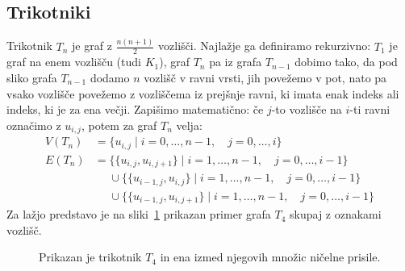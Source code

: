 \documentclass[12pt,a4paper,twoside]{article}
\theoremstyle{definition} %
\theoremstyle{plain} %
\numberwithin{equation}{section}  %
\begin{document}
\subsection{Trikotniki}
Trikotnik $T_n$ je graf z $\frac{n (n+1)}{2}$ vozlišči. Najlažje ga definiramo rekurzivno:
$T_1$ je graf na enem vozlišču (tudi $K_1$), graf $T_n$ pa iz grafa $T_{n-1}$ dobimo tako, da pod sliko grafa $T_{n-1}$ dodamo $n$ vozlišč v ravni vrsti, jih povežemo v pot, nato pa vsako vozlišče povežemo z vozliščema iz prejšnje ravni, ki imata enak indeks ali indeks, ki je za ena večji. Zapišimo matematično: če $j$-to vozlišče na $i$-ti ravni označimo z $u_{i,j}$, potem za graf $T_n$ velja:
\begin{align*}
    V(T_n) &= \{u_{i,j} \mid i=0,\ldots,n-1, \quad j=0,\ldots,i \} \\
    E(T_n) &= \{ \{u_{i,j}, u_{i, j+1} \} \mid i=1,\ldots,n-1, \quad j=0,\ldots,i-1  \} 
    \\ &\phantom{=} \cup \{ \{ u_{i-1, j}, u_{i,j}  \} \mid i=1,\ldots,n-1, \quad j=0,\ldots,i-1  \} 
    \\ &\phantom{=} \cup \{ \{ u_{i-1, j},u_{i,j+1} \} \mid i=1,\ldots,n-1, \quad j=0,\ldots,i-1  \} 
\end{align*}
Za lažjo predstavo je na sliki~\ref{fig:trikotnik} prikazan primer grafa $T_4$ skupaj z oznakami vozlišč.
\begin{figure}[h]
    \centering
    \caption{Prikazan je trikotnik $T_4$ in ena izmed njegovih množic ničelne prisile.}
    \label{fig:trikotnik}
\end{figure}
\end{document}
